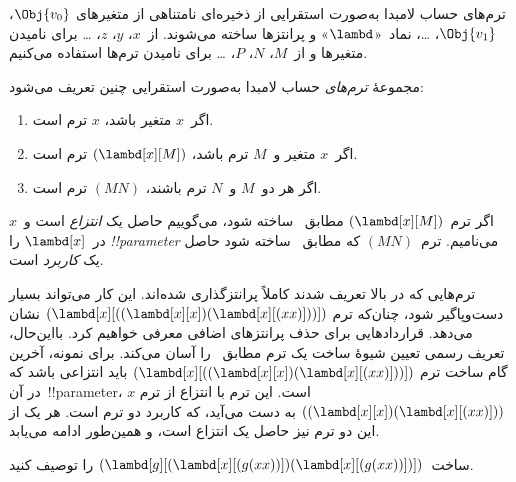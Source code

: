 \documentclass[../../../include/open-logic-section]{subfiles}
\begin{document}

ترم‌های حساب لامبدا به‌صورت استقرایی از ذخیره‌ای نامتناهی از متغیرهای
$\Obj{v_0}$، $\Obj{v_1}$، \dots، نماد~«$\lambd$» و پرانتزها ساخته
می‌شوند. از~$x$، $y$، $z$، \dots{} برای نامیدن متغیرها و از~$M$، $N$،
$P$، \dots{} برای نامیدن ترم‌ها استفاده می‌کنیم.

\begin{defn}[ترم‌ها] 
مجموعهٔ \emph{ترم‌های} حساب لامبدا به‌صورت استقرایی چنین تعریف می‌شود:
\begin{enumerate}
  \item {} اگر~$x$ متغیر باشد، $x$ ترم است.
  \item {} اگر~$x$ متغیر و~$M$ ترم باشد،
    $(\lambd[x][M])$ ترم است.
  \item {} اگر هر دو~$M$ و~$N$ ترم باشند،
    $(MN)$ ترم است.
\end{enumerate}
\end{defn}

اگر ترم~$(\lambd[x][M])$ مطابق~ ساخته شود، می‌گوییم
حاصل یک \emph{انتزاع} است و~$x$ در~$\lambd[x]$ را \emph{!!{parameter}}
می‌نامیم. ترم~$(MN)$ که مطابق~ ساخته شود حاصل یک
\emph{کاربرد} است.

ترم‌هایی که در بالا تعریف شدند کاملاً پرانتزگذاری شده‌اند. این کار
می‌تواند بسیار دست‌وپاگیر شود، چنان‌که ترم
$(\lambd[x][((\lambd[x][x])(\lambd[x][(xx)]))])$ نشان می‌دهد. قراردادهایی
برای حذف پرانتزهای اضافی معرفی خواهیم کرد. بااین‌حال، تعریف رسمی تعیین
شیوهٔ ساخت یک ترم مطابق~ را آسان می‌کند. برای نمونه،
آخرین گام ساخت ترم
$(\lambd[x][((\lambd[x][x])(\lambd[x][(xx)]))])$ باید انتزاعی باشد که
در آن~!!{parameter}، $x$ است. این ترم با انتزاع از ترم
$((\lambd[x][x])(\lambd[x][(xx)]))$ به دست می‌آید، که کاربرد دو ترم است.
هر یک از این دو ترم نیز حاصل یک انتزاع است، و همین‌طور ادامه می‌یابد.

\begin{prob}
ساخت~$(\lambd[g][(\lambd[x][(g (x x))])
  (\lambd[x][(g (x x))])])$ را توصیف کنید.
\end{prob}
\end{document}
